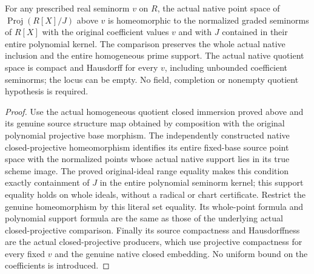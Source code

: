 \begin{theorem}
\label{graded:native-polynomial-homogeneous-quotient-points}
\leanok
{}
For any prescribed real seminorm $v$ on $R$, the actual native point
space of $\operatorname{Proj}(R[X]/J)$ above $v$ is homeomorphic to
the normalized graded seminorms of $R[X]$ with the original coefficient
values $v$ and with $J$ contained in their entire polynomial kernel.
The comparison preserves the whole actual native inclusion and the
entire homogeneous prime support. The actual native quotient space
is compact and Hausdorff for every $v$, including unbounded coefficient
seminorms; the locus can be empty. No field, completion or nonempty
quotient hypothesis is required.
\end{theorem}
\begin{proof}
Use the actual homogeneous quotient closed immersion proved above and
its genuine source structure map obtained by composition with the
original polynomial projective base morphism. The independently
constructed native closed-projective homeomorphism identifies its
entire fixed-base source point space with the normalized points whose
actual native support lies in its true scheme image. The proved
original-ideal range equality makes this condition exactly containment
of $J$ in the entire polynomial seminorm kernel; this support equality
holds on whole ideals, without a radical or chart certificate.
Restrict the genuine homeomorphism by this literal set equality.
Its whole-point formula and polynomial support formula are the same
as those of the underlying actual closed-projective comparison.
Finally its source compactness and Hausdorffness are the actual
closed-projective producers, which use projective compactness for
every fixed $v$ and the genuine native closed embedding. No uniform
bound on the coefficients is introduced.
\end{proof}
